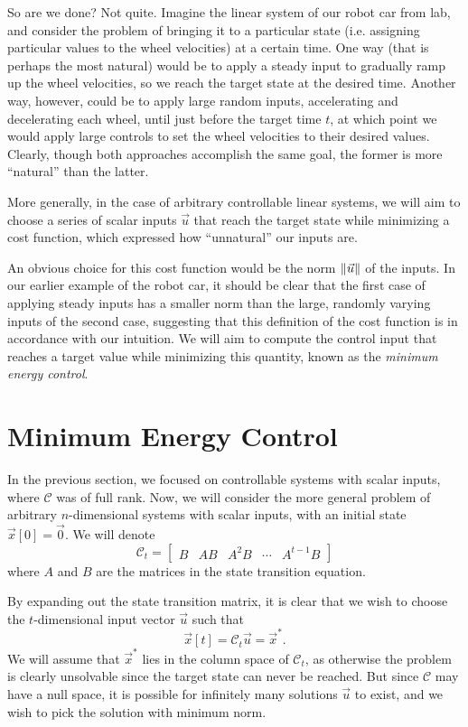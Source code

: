 \documentclass[letterpaper]{article}
\theoremstyle{remark}
\newcommand{\mat}[1]{\ensuremath{\begin{bmatrix}#1\end{bmatrix}}}
\begin{document}
So are we done? Not quite. Imagine the linear system of our robot car from lab, and consider the problem of bringing it to a particular state (i.e. assigning particular values to the wheel velocities) at a certain time. One way (that is perhaps the most natural) would be to apply a steady input to gradually ramp up the wheel velocities, so we reach the target state at the desired time. Another way, however, could be to apply large random inputs, accelerating and decelerating each wheel, until just before the target time $t$, at which point we would apply large controls to set the wheel velocities to their desired values. Clearly, though both approaches accomplish the same goal, the former is more ``natural'' than the latter.

More generally, in the case of arbitrary controllable linear systems, we will aim to choose a series of scalar inputs $\vec{u}$ that reach the target state while minimizing a cost function, which expressed how ``unnatural'' our inputs are. 

An obvious choice for this cost function would be the norm $\norm{\vec{u}}$ of the inputs. In our earlier example of the robot car, it should be clear that the first case of applying steady inputs has a smaller norm than the large, randomly varying inputs of the second case, suggesting that this definition of the cost function is in accordance with our intuition. We will aim to compute the control input that reaches a target value while minimizing this quantity, known as the \emph{minimum energy control}.

\section{Minimum Energy Control}
In the previous section, we focused on controllable systems with scalar inputs, where $\mathscr{C}$ was of full rank. Now, we will consider the more general problem of arbitrary $n$-dimensional systems with scalar inputs, with an initial state $\vec{x}[0] = \vec{0}$. We will denote
\[
    \mathscr{C}_t = \mat{B & AB & A^2B & \cdots & A^{t-1}B}
\]
where $A$ and $B$ are the matrices in the state transition equation.

By expanding out the state transition matrix, it is clear that we wish to choose the $t$-dimensional input vector $\vec{u}$ such that
\[
    \vec{x}[t] = \mathscr{C}_t\vec{u} = \vec{x}^*.
\]
We will assume that $\vec{x}^*$ lies in the column space of $\mathscr{C}_t$, as otherwise the problem is clearly unsolvable since the target state can never be reached. But since $\mathscr{C}$ may have a null space, it is possible for infinitely many solutions $\vec{u}$ to exist, and we wish to pick the solution with minimum norm.
\end{document}
